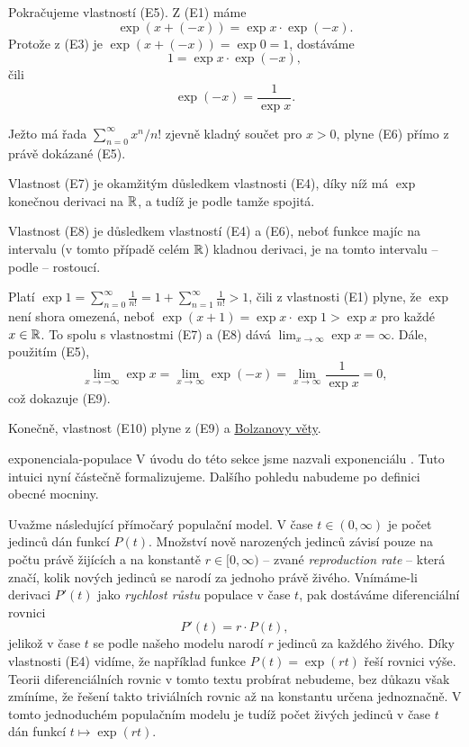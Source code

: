 Pokračujeme vlastností (E5). Z (E1) máme
\[
 \exp(x + (-x)) = \exp x \cdot \exp(-x).
\]
Protože z (E3) je $\exp(x + (-x)) = \exp 0 = 1$, dostáváme
\[
 1 = \exp x \cdot \exp(-x),
\]
čili
\[
 \exp(-x) = \frac{1}{\exp x}.
\]

Ježto má řada $\sum_{n=0}^{\infty} x^{n} / n!$ zjevně kladný součet pro $x > 0$,
plyne (E6) přímo z právě dokázané (E5).

Vlastnost (E7) je okamžitým důsledkem vlastnosti (E4), díky níž má $\exp$
konečnou derivaci na $\mathbb{R}$, a tudíž je podle
 tamže spojitá.

Vlastnost (E8) je důsledkem vlastností (E4) a (E6), neboť funkce majíc na
intervalu (v tomto případě celém $\mathbb{R}$) kladnou derivaci, je na tomto intervalu
-- podle  -- rostoucí.

Platí $\exp 1 = \sum_{n=0}^{\infty} \frac{1}{n!} = 1 + \sum_{n=1}^{\infty}
\frac{1}{n!} > 1$, čili z vlastnosti (E1) plyne, že $\exp$ není shora omezená,
neboť $\exp(x+1) = \exp x \cdot \exp 1 > \exp x$ pro každé $x \in \mathbb{R}$. To spolu
s vlastnostmi (E7) a (E8) dává $\lim_{x \to \infty} \exp x = \infty$. Dále,
použitím (E5),
\[
 \lim_{x \to -\infty} \exp x = \lim_{x \to \infty} \exp(-x) = \lim_{x \to
 \infty} \frac{1}{\exp x} = 0,
\]
což dokazuje (E9).

Konečně, vlastnost (E10) plyne z (E9) a \hyperref[thm:bolzanova]{Bolzanovy
věty}.

\begin{example}{}{exponenciala-populace}
 V úvodu do této sekce jsme nazvali exponenciálu .
 Tuto intuici nyní částečně formalizujeme. Dalšího pohledu nabudeme po definici
 obecné mocniny.

 Uvažme následující přímočarý populační model. V čase $t \in (0,\infty)$ je
 počet jedinců dán funkcí $P(t)$. Množství nově narozených jedinců závisí pouze
 na počtu právě žijících a na konstantě $r \in [0,\infty)$ -- zvané
 \emph{reproduction rate} -- která značí, kolik nových jedinců se narodí za
 jednoho právě živého. Vnímáme-li derivaci $P'(t)$ jako \emph{rychlost růstu}
 populace v čase $t$, pak dostáváme diferenciální rovnici
 \[
  P'(t) = r \cdot P(t),
 \]
 jelikož v čase $t$ se podle našeho modelu narodí $r$ jedinců za každého živého.
 Díky vlastnosti (E4) vidíme, že například funkce $P(t) = \exp(rt)$ řeší rovnici
 výše. Teorii diferenciálních rovnic v tomto textu probírat nebudeme, bez důkazu
 však zmíníme, že řešení takto triviálních rovnic až na konstantu určena
 jednoznačně. V tomto jednoduchém populačním modelu je tudíž počet živých
 jedinců v čase $t$ dán funkcí $t \mapsto \exp(rt).$
\end{example}

